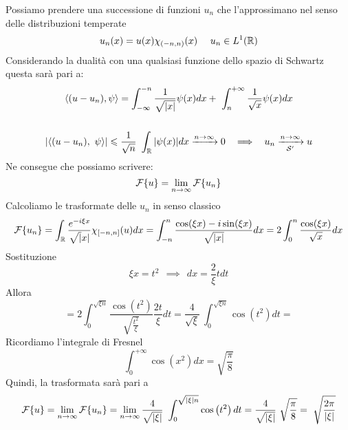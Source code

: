 Possiamo prendere una successione di funzioni $u_{n}$ che l'approssimano nel senso delle distribuzioni temperate
\begin{equation*}
u_{n}(x) = u(x) \chi _{(- n,n)}(x) \ \ \ \ u_{n} \in L^{1} (\mathbb{R})
\end{equation*}
Considerando la dualità con una qualsiasi funzione dello spazio di Schwartz questa sarà pari a:
\begin{gather*}
\langle (u - u_{n}) ,\psi \rangle = \int ^{ - n}_{ - \infty }\frac{1}{\sqrt{| x| }} \psi (x) dx + \ \int ^{ + \infty }_{n}\frac{1}{\sqrt{x}} \psi (x) dx\\
\\
| \langle (u - u_{n}) ,\ \psi \rangle | \leqslant \frac{1}{\sqrt{n}} \ \int _{\RR }| \psi (x)| dx\xrightarrow{n\rightarrow \infty } 0\ \ \implies \ \ u_{n}\xrightarrow[\Sc  ']{n\rightarrow \infty } u
\end{gather*}
Ne consegue che possiamo scrivere:
\begin{equation*}
\mathcal{F} \{u\} = \lim _{n\rightarrow \infty }\mathcal{F} \{u_{n}\}
\end{equation*}
Calcoliamo le trasformate delle $u_{n}$ in senso classico
\begin{equation*}
\mathcal{F} \{u_{n}\} = \int _{\mathbb{R} }\frac{e^{ - i\xi x}}{\sqrt{|} x|} \chi _{[ - n,n]} (u)dx = \int ^{n}_{ - n}\frac{\cos(\xi x) - i\sin (\xi x)}{\sqrt{| x| }} dx = 2\int ^{n}_{0}\frac{\cos(\xi x)}{\sqrt{x}} dx
\end{equation*}
Sostituzione
\begin{equation*}
\xi x = t^{2} \ \ \implies \ \ dx = \frac{2}{\xi } tdt
\end{equation*}
Allora
\begin{equation*}
= 2\int ^{\sqrt{\xi n}}_{0}\frac{\cos\left(t^{2}\right)}{\sqrt{\frac{t^{2}}{\xi }}}\frac{2t}{\xi } dt = \frac{4}{\sqrt{\xi }} \ \int ^{\sqrt{\xi n}}_{0}\cos\left(t^{2}\right) dt =
\end{equation*}
Ricordiamo l'integrale di Fresnel
\begin{equation*}
\int ^{ + \infty }_{0}\cos\left(x^{2}\right) dx = \sqrt{\frac{\pi }{8}}
\end{equation*}
Quindi, la trasformata sarà pari a
\begin{equation*}
\Fc \{u\} = \lim _{n\rightarrow \infty }\Fc \{u_{n}\} = \lim _{n\rightarrow \infty }\frac{4}{\sqrt{| \xi | }} \ \int ^{\sqrt{| \xi | n}}_{0}\cos\left(t^{2}\right) dt = \frac{4}{\sqrt{| \xi | }} \ \sqrt{\frac{\pi }{8}} = \ \sqrt{\frac{2\pi }{| \xi | }}
\end{equation*}
